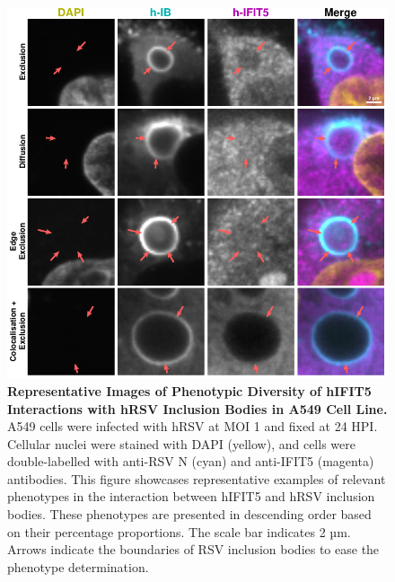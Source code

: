 \begin{figure}
    \centering
    \includegraphics[width=1\linewidth]{08. Chapter 3/Figs/02. Infection/04. IFIT5/03. a549 i5.pdf}
    \caption[Representative Images of Phenotypic Diversity of hIFIT5 Interactions with hRSV Inclusion Bodies in A549 Cell Line.]{\textbf{Representative Images of Phenotypic Diversity of hIFIT5 Interactions with hRSV Inclusion Bodies in A549 Cell Line.} A549 cells were infected with hRSV at MOI 1 and fixed at 24 HPI. Cellular nuclei were stained with DAPI (yellow), and cells were double-labelled with anti-RSV N (cyan) and anti-IFIT5 (magenta) antibodies. This figure showcases representative examples of relevant phenotypes in the interaction between hIFIT5 and hRSV inclusion bodies. These phenotypes are presented in descending order based on their percentage proportions. The scale bar indicates 2 µm.  Arrows indicate the boundaries of RSV inclusion bodies to ease the phenotype determination.}
    \label{fig:Representative Images of Phenotypic Diversity of hIFIT5 Interactions with hRSV Inclusion Bodies in A549 Cell Line}
\end{figure}


